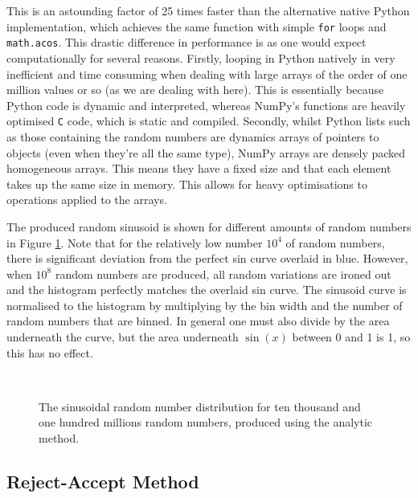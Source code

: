 This is an astounding factor of 25 times faster than the alternative native Python implementation, which achieves the same function with simple \texttt{for} loops and \texttt{math.acos}. This drastic difference in performance is as one would expect computationally for several reasons. Firstly, looping in Python natively in very inefficient and time consuming when dealing with large arrays of the order of one million values or so (as we are dealing with here). This is essentially because Python code is dynamic and interpreted, whereas NumPy's functions are heavily optimised \texttt{C} code, which is static and compiled. Secondly, whilst Python lists such as those containing the random numbers are dynamics arrays of pointers to objects (even when they're all the same type), NumPy arrays are densely packed homogeneous arrays. This means they have a fixed size and that each element takes up the same size in memory. This allows for heavy optimisations to operations applied to the arrays\cite{WhatIsNumPy}.

The produced random sinusoid is shown for different amounts of random numbers in Figure \ref{fig:analytic_sin}. Note that for the relatively low number $10^4$ of random numbers, there is significant deviation from the perfect sin curve overlaid in blue. However, when $10^8$ random numbers are produced, all random variations are ironed out and the histogram perfectly matches the overlaid sin curve. The sinusoid curve is normalised to the histogram by multiplying by the bin width and the number of random numbers that are binned. In general one must also divide by the area underneath the curve, but the area underneath $\sin(x)$ between 0 and 1 is 1, so this has no effect.

\begin{figure}
    \centering
     \\
    \caption{The sinusoidal random number distribution for ten thousand and one hundred millions random numbers, produced using the analytic method.}
    \label{fig:analytic_sin}
\end{figure}

\subsection{Reject-Accept Method}
\label{subsec:reject-accept_method}

